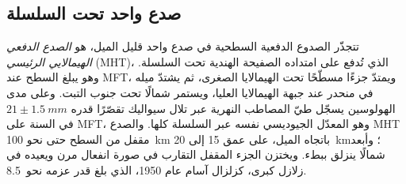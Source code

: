 \subsection{صدع واحد تحت السلسلة}

تتجذّر الصدوع الدفعية السطحية في صدع واحد قليل الميل، هو \emph{الصدع الدفعي
الهيمالايي الرئيسي} (MHT)، الذي تُدفع على امتداده الصفيحة الهندية تحت السلسلة. وهو يبلغ
السطح عند MFT، ويمتدّ جزءًا مسطّحًا تحت الهيمالايا الصغرى، ثم يشتدّ ميله في منحدر عند
جبهة الهيمالايا العليا، ويستمر شمالًا تحت جنوب التبت. وعلى مدى الهولوسين
يسجّل طيّ المصاطب النهرية عبر تلال سيواليك تقصّرًا قدره $21 \pm \qty{1.5}{mm}$ في السنة
على MFT، وهو المعدّل الجيوديسي نفسه عبر السلسلة كلها. والصدع MHT
مقفل من السطح حتى نحو \qty{100}{km} باتجاه الميل، على عمق 15 إلى \qty{20}{km}؛ وأبعد
شمالًا ينزلق ببطء. ويختزن الجزء المقفل التقارب في صورة انفعال مرن ويعيده
في زلازل كبرى، كزلزال آسام عام 1950، الذي بلغ قدر عزمه نحو~8.5.

